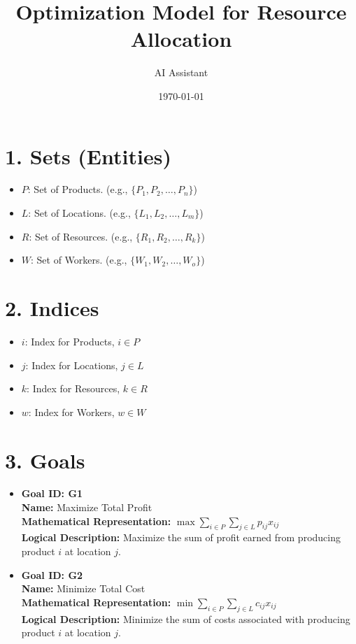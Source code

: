 \documentclass{article}
\title{Optimization Model for Resource Allocation}
\author{AI Assistant}
\date{\today}
\begin{document}
\maketitle

\tableofcontents
\newpage

\section{1. Sets (Entities)}
\begin{itemize}
    \item $P$: Set of Products.  (e.g., $\{P_1, P_2, \dots, P_n\}$)
    \item $L$: Set of Locations. (e.g., $\{L_1, L_2, \dots, L_m\}$)
    \item $R$: Set of Resources. (e.g., $\{R_1, R_2, \dots, R_k\}$)
    \item $W$: Set of Workers. (e.g., $\{W_1, W_2, \dots, W_o\}$)
\end{itemize}

\section{2. Indices}
\begin{itemize}
    \item $i$: Index for Products, $i \in P$
    \item $j$: Index for Locations, $j \in L$
    \item $k$: Index for Resources, $k \in R$
    \item $w$: Index for Workers, $w \in W$
\end{itemize}

\section{3. Goals}
\begin{itemize}
    \item \textbf{Goal ID: G1} \\
      \textbf{Name:} Maximize Total Profit \\
      \textbf{Mathematical Representation:} $\max \sum_{i \in P} \sum_{j \in L} p_{ij} x_{ij}$  \\
      \textbf{Logical Description:} Maximize the sum of profit earned from producing product $i$ at location $j$.
    \item \textbf{Goal ID: G2} \\
      \textbf{Name:} Minimize Total Cost \\
      \textbf{Mathematical Representation:} $\min \sum_{i \in P} \sum_{j \in L} c_{ij} x_{ij}$ \\
      \textbf{Logical Description:} Minimize the sum of costs associated with producing product $i$ at location $j$.
\end{itemize}
\end{document}
